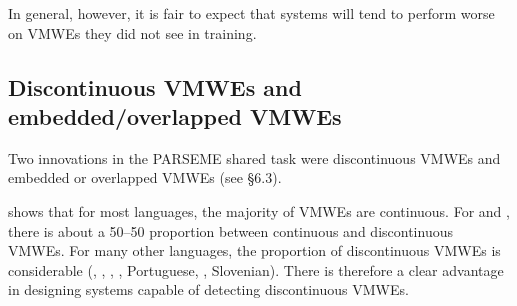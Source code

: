 \documentclass[output=paper
,modfonts
,nonflat,draftmode]{langsci/langscibook}
\begin{document}



 In general, however, it is fair to expect that systems will tend to perform worse on VMWEs they did not see in training.  


\subsection{Discontinuous VMWEs and embedded/overlapped VMWEs}
Two innovations in the PARSEME shared task were discontinuous VMWEs and embedded or overlapped VMWEs (see  §6.3).


 shows that for most languages, the majority of VMWEs are continuous. For  and , there is about a 50--50 proportion between continuous and discontinuous VMWEs. For many other languages, the proportion of discontinuous VMWEs is considerable (, , , , Portuguese, , Slovenian). There is therefore a clear advantage in designing systems capable of detecting discontinuous VMWEs.
\end{document}
